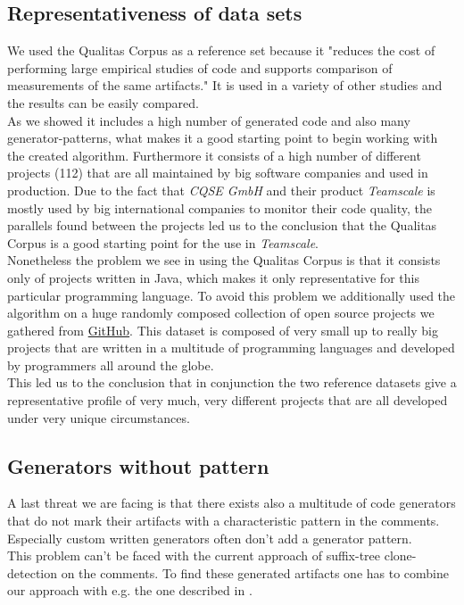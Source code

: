 \subsection{Representativeness of data sets}
We used the Qualitas Corpus as a reference set because it "reduces the cost of performing large empirical studies of code and supports comparison of measurements of the same artifacts."\cite[p.~1]{TemperoEwanandAnslowCraigandDietrichJensandHanTedandLiJingandLumpeMarkusandMeltonHaydenandNoble2010a} It is used in a variety of other studies and the results can be easily compared.\\
As we showed it includes a high number of generated code and also many generator-patterns, what makes it a good starting point to begin working with the created algorithm. Furthermore it consists of a high number of different projects (112) that are all maintained by big software companies and used in production. Due to the fact that \textit{CQSE GmbH} and their product \textit{Teamscale} is mostly used by big international companies to monitor their code quality, the parallels found between the projects led us to the conclusion that the Qualitas Corpus is a good starting point for the use in \textit{Teamscale}.\\
Nonetheless the problem we see in using the Qualitas Corpus is that it consists only of projects written in Java, which makes it only representative for this particular programming language. To avoid this problem we additionally used the algorithm on a huge randomly composed collection of open source projects we gathered from \href{github.com}{GitHub}. This dataset is composed of very small up to really big projects that are written in a multitude of programming languages and developed by programmers all around the globe.\\
This led us to the conclusion that in conjunction the two reference datasets give a representative profile of very much, very different projects that are all developed under very unique circumstances.

\subsection{Generators without pattern}
A last threat we are facing is that there exists also a multitude of code generators that do not mark their artifacts with a characteristic pattern in the comments. Especially custom written generators often don't add a generator pattern.\\
This problem can't be faced with the current approach of suffix-tree clone-detection on the comments. To find these generated artifacts one has to combine our approach with e.g. the one described in \cite{Bernwieser2014}.